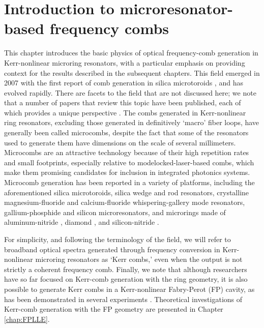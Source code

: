 \chapter{Introduction to microresonator-based frequency combs}
 \label{chap:microresonators}

 
 This chapter introduces the basic physics of optical frequency-comb generation in Kerr-nonlinear microring resonators, with a particular emphasis on providing context for the results described in the subsequent chapters. This field emerged in 2007 with the first report of comb generation in silica microtoroids \cite{DelHaye2007}, and has evolved rapidly. There are facets to the field that are not discussed here; we note that a number of papers that review this topic have been published, each of which provides a unique perspective \cite{Kippenberg2011,Savchenkov2016,Chembo2016a,Pasquazi2018}. The combs generated in Kerr-nonlinear ring resonators, excluding those generated in definitively `macro' fiber loops, have generally been called microcombs, despite the fact that some of the resonators used to generate them have dimensions on the scale of several millimeters. Microcombs are an attractive technology because of their high repetition rates and small footprints, especially relative to modelocked-laser-based combs, which make them promising candidates for inclusion in integrated photonics systems. Microcomb generation has been reported in a variety of platforms, including the aforementioned silica microtoroids, silica wedge \cite{Lee2012,Yi2015} and rod \cite{DelHaye2013} resonators, crystalline magnesium-fluoride \cite{Liang2011} and calcium-fluoride \cite{Savchenkov2008} whispering-gallery mode resonators, gallium-phosphide \cite{Wilson2018} and silicon \cite{Griffith2016} microresonators, and microrings made of aluminum-nitride \cite{Jung2013}, diamond \cite{Hausmann2014}, and silicon-nitride \cite{Okawachi2011,Moss2013}.
 
 For simplicity, and following the terminology of the field, we will refer to broadband optical spectra generated through frequency conversion in Kerr-nonlinear microring resonators as `Kerr combs,' even when the output is not strictly a coherent frequency comb. Finally, we note that although researchers have so far focused on Kerr-comb generation with the ring geometry, it is also possible to generate Kerr combs in a Kerr-nonlinear Fabry-Perot (FP) cavity, as has been demonstrated in several experiments \cite{Braje2009,Obrzud2017}. Theoretical investigations of Kerr-comb generation with the FP geometry are presented in Chapter \ref{chap:FPLLE}.
 

